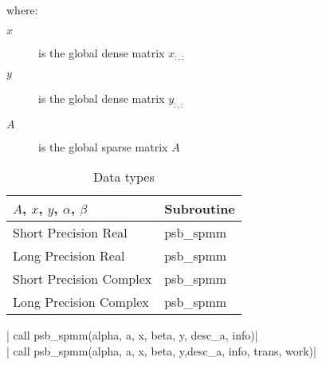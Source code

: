 where:
\begin{description}
\item[$x$] is the global dense matrix $x_{:, :}$
\item[$y$] is the global dense matrix $y_{:, :}$
\item[$A$] is the global sparse matrix $A$
\end{description}

\begin{table}[h]
\begin{center}
\begin{tabular}{ll}
\hline
$A$, $x$, $y$, $\alpha$, $\beta$ & {\bf Subroutine}\\
\hline
Short Precision Real & psb\_spmm \\
Long Precision Real & psb\_spmm \\
Short Precision Complex & psb\_spmm \\
Long Precision Complex & psb\_spmm \\
\hline
\end{tabular}
\end{center}
\caption{Data types\label{tab:f90spmm}}
\end{table}

\fortinline| call psb_spmm(alpha, a, x, beta, y, desc_a, info)|\\
\fortinline| call psb_spmm(alpha, a, x, beta, y,desc_a, info, trans, work)|

